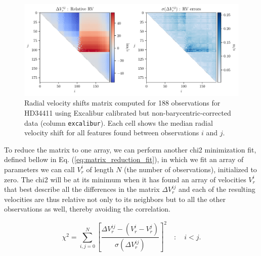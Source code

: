     \begin{figure}%
        \begin{wide}  
            \includegraphics[width=\textwidth]{figures/shfits_matrix_non_bary.pdf}
            \caption{Radial velocity shifts matrix computed for 188 observations for HD34411 using Excalibur calibrated but non-barycentric-corrected data (column \texttt{excalibur}). Each cell shows the median radial velocity shift for all features found between observations $i$ and $j$.}
        \label{fig:shift_matrix}
        \end{wide}
    \end{figure}

    \vspace*{-0.5cm}
            
    To reduce the matrix to one array, we can perform another chi2 minimization fit, defined bellow in Eq. (\ref{eq:matrix_reduction_fit}), in which we fit an array of parameters we can call $V_r^i$ of length $N$ (the number of observations), initialized to zero. The chi2 will be at its minimum when it has found an array of velocities $V_r^i$ that best describe all the differences in the matrix $\Delta V_r^{ij}$ and each of the resulting velocities are thus relative not only to its neighbors but to all the other observations as well, thereby avoiding the correlation.
    
    \begin{equation}
        \label{eq:matrix_reduction_fit}
        \chi^{2}=\sum_{i,j = 0}^{N}\left[\frac{ \Delta V_{r}^{ij} - (V_r^i - V_r^j) }{\sigma(\Delta V_{r}^{ij})}\right]^{2} \quad : \quad i < j.
    \end{equation}


